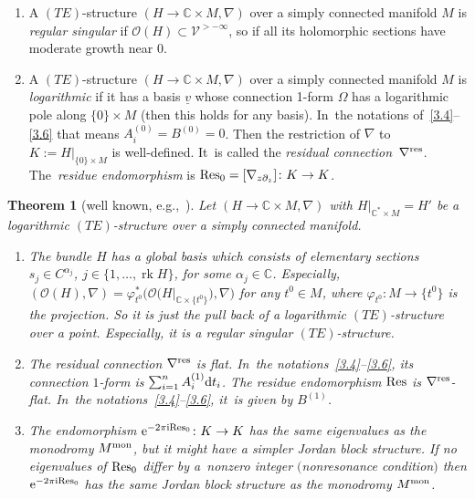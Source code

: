 \documentclass[pdftex]{sigma}%
\numberwithin{equation}{section}
\numberwithin{figure}{section}
\newcommand{\C}{{\mathbb C}}
\newcommand{\OO}{{\mathcal O}}
\newcommand{\VV}{{\mathcal V}}
\newcommand{\ddd}{{\rm d}}
\newcommand{\uuuu}{\underline}
\newcommand{\paa}{\partial}
\newcommand{\nnn}{\nabla}
\DeclareMathOperator{\rk}{rk}
\newtheorem{Theorem}{Theorem}[section]
\begin{document}
\begin{Definition}\qquad%
\begin{enumerate}\itemsep=0pt
\item[$(a)$] A $(TE)$-structure $(H\to\C\times M ,\nnn)$
over a simply connected manifold $M$ is
{\it regular singular} if $\OO(H)\subset \VV^{>-\infty}$,
so if all its holomorphic sections have moderate growth
near 0.

\item[$(b)$] A $(TE)$-structure $(H\to\C\times M ,\nnn)$
over a simply connected manifold $M$ is {\it logarithmic} if
it has a basis $\uuuu{v}$ whose connection 1-form
$\Omega$ has a logarithmic pole along $\{0\}\times M$
(then this holds for any basis). In~the notations of~\eqref{3.4}--\eqref{3.6} that means
$A_i^{(0)}=B^{(0)}=0$.
Then the restriction of $\nnn$ to $K:=H|_{\{0\}\times M}$
is well-defined. It~is called the {\it residual connection}~$\nnn^{\rm res}$. The~{\it residue endomorphism} is
${\rm Res}_0=[\nnn_{z\paa_z}]\colon K\to K$.
\end{enumerate}
\end{Definition}


\begin{Theorem}[{well known, e.g.,~\cite[Theorems 7.10 and~8.7]{He02}}]\label{t3.23}
Let $(H\to\C\times M,\nnn)$ with $H|_{\C^*\times M}=H'$
be a logarithmic $(TE)$-structure over a simply
connected manifold.
\begin{enumerate}\itemsep=0pt
\item[$(a)$] The bundle $H$ has a global basis which consists of
elementary sections $s_j\in C^{\alpha_j}$,
$j\in\{1,\dots ,\rk H\}$, for some $\alpha_j\in\C$.
Especially, $(\OO(H),\nnn)=\varphi_{t^0}^*
\big(\OO\big(H|_{\C\times\{t^0\}}\big),\nnn\big)$
for any $t^0\in M$, where $\varphi_{t^0}\colon M\to\big\{t^0\big\}$
is the projection. So it is just the pull back of
a logarithmic $(TE)$-structure over a point.
Especially, it is a regular singular $(TE)$-structure.

\item[$(b)$] The residual connection $\nnn^{\rm res}$ is flat. In~the notations~\eqref{3.4}--\eqref{3.6}, its
connection $1$-form is $\sum_{i=1}^n A_i^{(1)}\ddd t_i$.
The residue endomorphism ${\rm Res}$ is $\nnn^{\rm res}$-flat. In~the notations~\eqref{3.4}--\eqref{3.6}, it~is given
by $B^{(1)}$.

\item[$(c)$] The endomorphism ${\rm e}^{-2\pi {\rm i}{\rm Res}_0}\colon K\to K$
has the same eigenvalues as the monodromy $M^{\rm mon}$,
but it might have a simpler Jordan block structure.
If no eigenvalues of ${\rm Res}_0$
differ by a~nonzero integer
$($nonresonance condition$)$ then ${\rm e}^{-2\pi {\rm i}{\rm Res}_0}$
has the same Jordan block structure as the mono\-dromy $M^{\rm mon}$.
\end{enumerate}
\end{Theorem}
\end{document}
